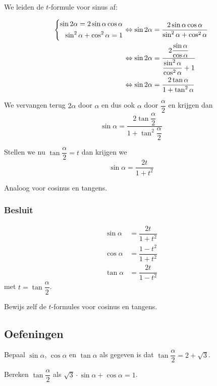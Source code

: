 \documentclass[a4paper,12pt]{article}
\begin{document}
We leiden de $t$-formule voor sinus af:

\begin{align*}
  \left\{\begin{aligned}\sin 2\alpha = 2\sin\alpha\cos\alpha\\\sin^2\alpha + \cos^2\alpha = 1\end{aligned}\right. &\Leftrightarrow \sin 2\alpha = \dfrac{2\sin\alpha\cos\alpha}{\sin^2\alpha + \cos^2\alpha}\\
  &\Leftrightarrow \sin 2\alpha = \dfrac{2\dfrac{\sin\alpha}{\cos\alpha}}{\dfrac{\sin^2\alpha}{\cos^2\alpha}+1}\\
  &\Leftrightarrow \sin 2\alpha = \dfrac{2\tan\alpha}{1+\tan^2\alpha}
\end{align*}

We vervangen terug $2\alpha$ door $\alpha$ en dus ook $\alpha$ door $\dfrac{\alpha}{2}$ en krijgen dan
$$\sin\alpha = \dfrac{2\tan\dfrac{\alpha}{2}}{1+\tan^2\dfrac{\alpha}{2}}$$

Stellen we nu $\tan\dfrac{\alpha}{2}=t$ dan krijgen we
$$\sin\alpha = \dfrac{2t}{1+t^2}$$

Analoog voor cosinus en tangens.

\subsubsection*{Besluit}
\begin{align*}
  \sin\alpha &= \dfrac{2t}{1+t^2}\\
  \cos\alpha &= \dfrac{1-t^2}{1+t^2}\\
  \tan\alpha &= \dfrac{2t}{1-t^2}
\end{align*}
met $t=\tan \dfrac{\alpha}{2}$.

\begin{oefening}
Bewijs zelf de $t$-formules voor cosinus en tangens.
\end{oefening}

\subsection{Oefeningen}

\begin{oefening}
Bepaal $\sin\alpha$, $\cos\alpha$ en $\tan\alpha$ als gegeven is dat $\tan\dfrac{\alpha}{2}=2+\sqrt{3}$.
\end{oefening}

\begin{oefening}
Bereken $\tan\dfrac{\alpha}{2}$ als $\sqrt{3}\cdot\sin\alpha+\cos\alpha=1$.
\end{oefening}
\end{document}
